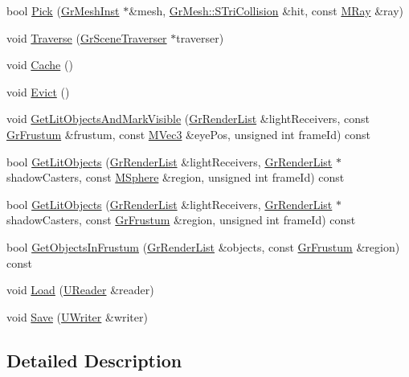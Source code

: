 \begin{CompactItemize}
\item 
bool \hyperlink{class_gr_b_s_p_tree_183214f29232744efa570aa39db1810b}{Pick} (\hyperlink{class_gr_mesh_inst}{GrMeshInst} $\ast$\&mesh, \hyperlink{struct_gr_mesh_1_1_s_tri_collision}{GrMesh::STriCollision} \&hit, const \hyperlink{class_m_ray}{MRay} \&ray)
\item 
void \hyperlink{class_gr_b_s_p_tree_f880f4a1b8a4ebb0b58df5f923d492b7}{Traverse} (\hyperlink{class_gr_scene_traverser}{GrSceneTraverser} $\ast$traverser)
\item 
void \hyperlink{class_gr_b_s_p_tree_ec1f9b6ad00f5859a6e18b298651b00b}{Cache} ()
\item 
void \hyperlink{class_gr_b_s_p_tree_af5e1a8c04f0b1a5e6ed48196078906a}{Evict} ()
\item 
void \hyperlink{class_gr_b_s_p_tree_465abf25bacaf871d1f1f854c23b2d9b}{GetLitObjectsAndMarkVisible} (\hyperlink{class_gr_render_list}{GrRenderList} \&lightReceivers, const \hyperlink{class_gr_frustum}{GrFrustum} \&frustum, const \hyperlink{class_m_vec3}{MVec3} \&eyePos, unsigned int frameId) const 
\item 
bool \hyperlink{class_gr_b_s_p_tree_4d4effc32f177216a7d577c0a1aac3f9}{GetLitObjects} (\hyperlink{class_gr_render_list}{GrRenderList} \&lightReceivers, \hyperlink{class_gr_render_list}{GrRenderList} $\ast$shadowCasters, const \hyperlink{class_m_sphere}{MSphere} \&region, unsigned int frameId) const 
\item 
bool \hyperlink{class_gr_b_s_p_tree_5583beab3c16526e2ef1234cf3f2e210}{GetLitObjects} (\hyperlink{class_gr_render_list}{GrRenderList} \&lightReceivers, \hyperlink{class_gr_render_list}{GrRenderList} $\ast$shadowCasters, const \hyperlink{class_gr_frustum}{GrFrustum} \&region, unsigned int frameId) const 
\item 
bool \hyperlink{class_gr_b_s_p_tree_4c964aff2bd50e39fad7d2df046a682e}{GetObjectsInFrustum} (\hyperlink{class_gr_render_list}{GrRenderList} \&objects, const \hyperlink{class_gr_frustum}{GrFrustum} \&region) const 
\item 
void \hyperlink{class_gr_b_s_p_tree_7ed8fc7d9debc4827138e75a4ef8f175}{Load} (\hyperlink{class_u_reader}{UReader} \&reader)
\item 
void \hyperlink{class_gr_b_s_p_tree_2c1454dfcd96cd85143d86f4fa5bb099}{Save} (\hyperlink{class_u_writer}{UWriter} \&writer)
\end{CompactItemize}


\subsection{Detailed Description}


